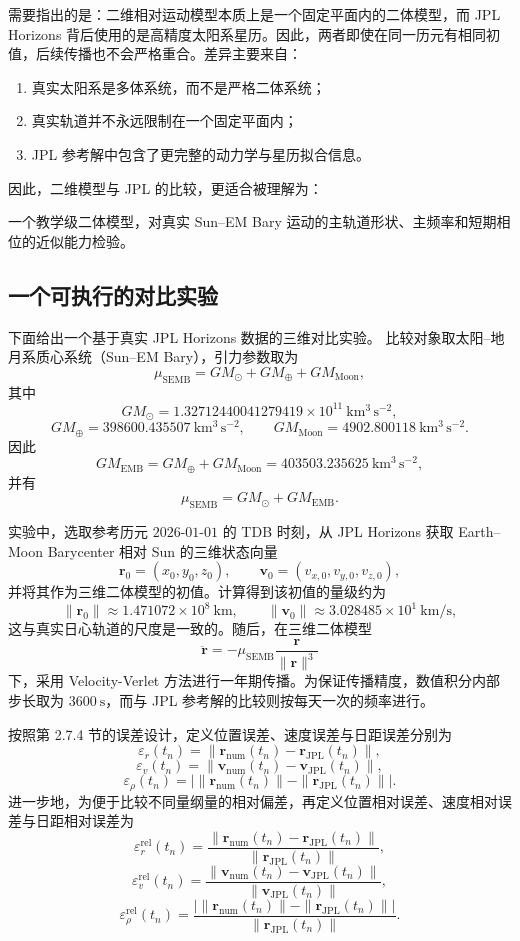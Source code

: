 需要指出的是：二维相对运动模型本质上是一个固定平面内的二体模型，而 JPL Horizons 背后使用的是高精度太阳系星历。因此，两者即使在同一历元有相同初值，后续传播也不会严格重合。差异主要来自：
\begin{enumerate}[label=\arabic*.]
  \item 真实太阳系是多体系统，而不是严格二体系统；
  \item 真实轨道并不永远限制在一个固定平面内；
  \item JPL 参考解中包含了更完整的动力学与星历拟合信息。
\end{enumerate}

因此，二维模型与 JPL 的比较，更适合被理解为：
\begin{center}
一个教学级二体模型，对真实 Sun--EM Bary 运动的主轨道形状、主频率和短期相位的近似能力检验。
\end{center}

\subsection{一个可执行的对比实验}

下面给出一个基于真实 JPL Horizons 数据的三维对比实验。
比较对象取太阳--地月系质心系统（Sun--EM Bary），引力参数取为
\[
\mu_{\mathrm{SEMB}} = GM_\odot + GM_\oplus + GM_{\mathrm{Moon}},
\]
其中
\[
GM_\odot = 1.32712440041279419\times 10^{11}\ \mathrm{km^3\,s^{-2}},
\]
\[
GM_\oplus = 398600.435507\ \mathrm{km^3\,s^{-2}},
\qquad
GM_{\mathrm{Moon}} = 4902.800118\ \mathrm{km^3\,s^{-2}}.
\]
因此
\[
GM_{\mathrm{EMB}} = GM_\oplus + GM_{\mathrm{Moon}} = 403503.235625\ \mathrm{km^3\,s^{-2}},
\]
并有
\[
\mu_{\mathrm{SEMB}} = GM_\odot + GM_{\mathrm{EMB}}.
\]

实验中，选取参考历元 \(2026\text{-}01\text{-}01\) 的 TDB 时刻，从 JPL Horizons 获取 Earth--Moon Barycenter 相对 Sun 的三维状态向量
\[
\bm r_0=(x_0,y_0,z_0),\qquad
\bm v_0=(v_{x,0},v_{y,0},v_{z,0}),
\]
并将其作为三维二体模型的初值。计算得到该初值的量级约为
\[
\|\bm r_0\| \approx 1.471072\times 10^8\ \mathrm{km},
\qquad
\|\bm v_0\| \approx 3.028485\times 10^1\ \mathrm{km/s},
\]
这与真实日心轨道的尺度是一致的。随后，在三维二体模型
\[
\ddot{\bm r}
=
-\mu_{\mathrm{SEMB}}\frac{\bm r}{\|\bm r\|^3}
\]
下，采用 Velocity-Verlet 方法进行一年期传播。为保证传播精度，数值积分内部步长取为 \(3600\ \mathrm{s}\)，而与 JPL 参考解的比较则按每天一次的频率进行。

按照第 2.7.4 节的误差设计，定义位置误差、速度误差与日距误差分别为
\[
\varepsilon_r(t_n)=\|\bm r_{\mathrm{num}}(t_n)-\bm r_{\mathrm{JPL}}(t_n)\|,
\]
\[
\varepsilon_v(t_n)=\|\bm v_{\mathrm{num}}(t_n)-\bm v_{\mathrm{JPL}}(t_n)\|,
\]
\[
\varepsilon_\rho(t_n)=\bigl|\|\bm r_{\mathrm{num}}(t_n)\|-\|\bm r_{\mathrm{JPL}}(t_n)\|\bigr|.
\]
进一步地，为便于比较不同量纲量的相对偏差，再定义位置相对误差、速度相对误差与日距相对误差为
\[
\varepsilon_r^{\mathrm{rel}}(t_n)
=
\frac{\|\bm r_{\mathrm{num}}(t_n)-\bm r_{\mathrm{JPL}}(t_n)\|}{\|\bm r_{\mathrm{JPL}}(t_n)\|},
\]
\[
\varepsilon_v^{\mathrm{rel}}(t_n)
=
\frac{\|\bm v_{\mathrm{num}}(t_n)-\bm v_{\mathrm{JPL}}(t_n)\|}{\|\bm v_{\mathrm{JPL}}(t_n)\|},
\]
\[
\varepsilon_\rho^{\mathrm{rel}}(t_n)
=
\frac{\bigl|\|\bm r_{\mathrm{num}}(t_n)\|-\|\bm r_{\mathrm{JPL}}(t_n)\|\bigr|}{\|\bm r_{\mathrm{JPL}}(t_n)\|}.
\]

